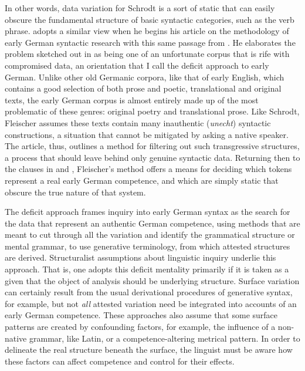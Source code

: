 In other words, data variation for Schrodt is a sort of static that can easily obscure the fundamental structure of basic syntactic categories, such as the verb phrase. \citet{Fleischer2006} adopts a similar view when he begins his article on the methodology of early German syntactic research with this same passage from \citet{Schrodt2004}. He elaborates the problem sketched out in \citet{Schrodt2004} as being one of an unfortunate corpus that is rife with compromised data, an orientation that I call the deficit approach to early German. Unlike other old Germanic corpora, like that of early English, which contains a good selection of both prose and poetic, translational and original texts, the early German corpus is almost entirely made up of the most problematic of these genres: original poetry and translational prose. Like Schrodt, Fleischer assumes these texts contain many inauthentic (\textit{unecht}) syntactic constructions, a situation that cannot be mitigated by asking a native speaker. The article, thus, outlines a method for filtering out such transgressive structures, a process that should leave behind only genuine syntactic data. Returning then to the clauses in  and , Fleischer’s method offers a means for deciding which tokens represent a real early German competence, and which are simply static that obscure the true nature of that system.

The deficit approach frames inquiry into early German syntax as the search for the data that represent an authentic German competence, using methods that are meant to cut through all the variation and identify the grammatical structure or mental grammar, to use generative terminology, from which attested structures are derived. Structuralist assumptions about linguistic inquiry underlie this approach. That is, one adopts this deficit mentality primarily if it is taken as a given that the object of analysis should be underlying structure. Surface variation can certainly result from the usual derivational procedures of generative syntax, for example, but not \textit{all} attested variation need be integrated into accounts of an early German competence. These approaches also assume that some surface patterns are created by confounding factors, for example, the influence of a non-native grammar, like Latin, or a competence-altering metrical pattern. In order to delineate the real structure beneath the surface, the linguist must be aware how these factors can affect competence and control for their effects.

